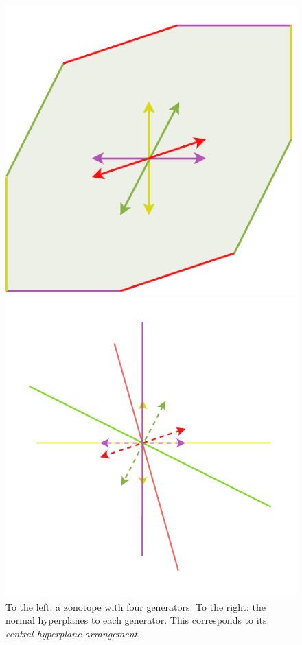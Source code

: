 \begin{figure}[!htb]
    \captionsetup{justification=centering}
    \begin{minipage}{0.49\linewidth}
        \centering
        \includegraphics[trim={0 0 0 10},clip, width=0.6\linewidth]{img/chapter_2/zonotope_edges_parallel_generator.pdf}
    \end{minipage}
    \hfill
    \begin{minipage}{0.49\linewidth}
        \centering
        \includegraphics[trim={10 50 10 50},clip,width=0.8\linewidth]{img/chapter_2/central_arrangement.pdf}
    \end{minipage}
    \caption{To the left: a zonotope with four generators. To the right: the normal hyperplanes to each generator. This corresponds to its \emph{central hyperplane arrangement}.}
    \label{fig:zonotope_hyperplane_arrangement}
\end{figure}
